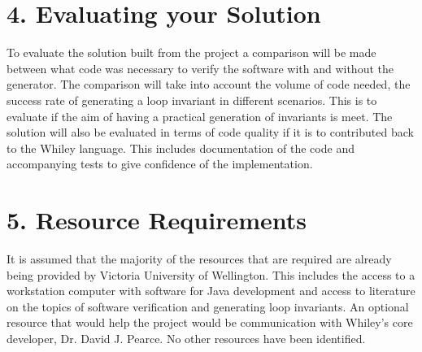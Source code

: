\documentclass[11pt, a4paper, twoside, openright]{report}
\begin{document}
\section*{4. Evaluating your Solution}



To evaluate the solution built from the project a comparison will
be made between what code was necessary to verify the software with and without
the generator.
The comparison will take into account the volume of code needed, the
success rate of generating a loop invariant in different scenarios.
This is to evaluate if the aim of having a practical generation of invariants
is meet.
The solution will also be evaluated in terms of code quality if it is
to contributed back to the Whiley language. This includes documentation
of the code and accompanying tests to give confidence of the implementation.


\section*{5. Resource Requirements}


It is assumed that the majority of the resources that are required are already being
provided by Victoria University of Wellington.
This includes the access to a workstation computer with software for Java development
and access to literature on the topics of software verification
and generating loop invariants.
An optional resource that would help the project would be communication
with Whiley's core developer, Dr. David J. Pearce.
No other resources have been identified.



\backmatter

%


\end{document}
